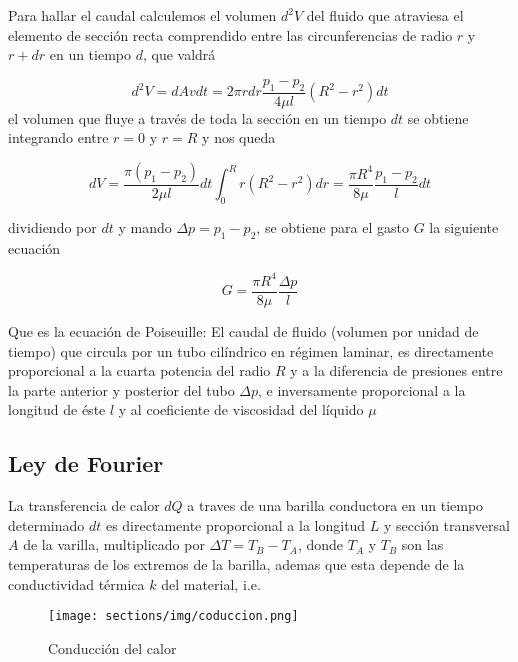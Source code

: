 Para hallar el caudal calculemos el volumen $d^2 V$ del fluido
que atraviesa el elemento de sección recta comprendido
entre las circunferencias de radio $r$ y $r + dr$ en un tiempo
$d$, que valdrá

\begin{equation*}
    d^2V = dA v dt = 2\pi r dr \frac{p_1 - p_2}{4 \mu l}(R^2 - r^2)dt
\end{equation*}
el volumen que fluye a través de toda la sección en un tiempo
$dt$ se obtiene integrando entre $r=0$
y $r=R$ y nos queda

\begin{equation*}
    dV = \frac{\pi (p_1 - p_2)}{2\mu l}dt \int_0^R r(R^2 - r^2)dr
    = \frac{\pi R^4}{8\mu}\frac{p_1 -  p_2}{l}dt
\end{equation*}

dividiendo por $dt$ y mando $\Delta p = p_1 - p_2$,
se obtiene para el gasto $G$ la siguiente ecuación

\begin{equation}
    \label{eq:Poiseuille}
    G = \frac{\pi R^4}{8 \mu} \frac{\Delta p}{l}
\end{equation}

Que es la ecuación de Poiseuille:
El caudal de fluido (volumen por unidad de tiempo) que circula
por un tubo cilíndrico en régimen laminar, es directamente
proporcional a la cuarta potencia del radio $R$ y a la diferencia
de presiones entre la parte anterior y posterior del tubo $\Delta p$,
e inversamente proporcional a la longitud de éste $l$ y 
al coeficiente de viscosidad del líquido $\mu$

\subsection{Ley de Fourier}
La transferencia de calor $dQ$ a traves de una
barilla conductora en un tiempo determinado $dt$ es directamente proporcional a la longitud $L$ y sección transversal
$A$ de la varilla, multiplicado por $\Delta T = T_B - T_A$, donde
$T_A$ y $T_B$ son las temperaturas de los extremos de la barilla,
ademas que esta depende de la conductividad térmica $k$ del 
material, i.e.

\begin{figure}[ht]
    \begin{center}
        \texttt{[image: sections/img/coduccion.png]}
    \end{center}
    \caption{Conducción del calor }
\end{figure}

